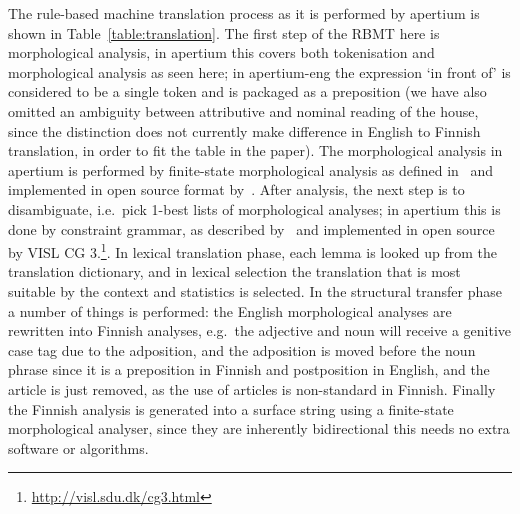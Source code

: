 \documentclass[free]{flammie}
\begin{document}
The rule-based machine translation process as it is performed by apertium is
shown in Table~\ref{table:translation}. The first step of the RBMT here is
morphological analysis, in apertium this covers both tokenisation and
morphological analysis as seen here; in apertium-eng the expression `in front
of' is considered to be a single token and is packaged as a preposition (we have
also omitted an ambiguity between attributive and nominal reading of the house,
since the distinction does not currently make difference in English to Finnish
translation, in order to fit the table in the paper). The morphological analysis
in apertium is performed by finite-state morphological analysis as defined
in~\cite{beesley2003finite} and implemented in open source format
by~\cite{linden2011hfst}.  After analysis, the next step is to disambiguate,
i.e.\ pick 1-best lists of morphological analyses; in apertium this is done by
constraint grammar, as described by~\cite{karlsson1990constraint} and
implemented in open source by VISL CG
3.\footnote{\url{http://visl.sdu.dk/cg3.html}}. In lexical translation phase,
each lemma is looked up from the translation dictionary, and in lexical
selection the translation that is most suitable by the context and statistics is
selected. In the structural transfer phase a number of things is performed: the
English morphological analyses are rewritten into Finnish analyses, e.g.\  the
adjective and noun will receive a genitive case tag due to the adposition, and
the adposition is moved before the noun phrase since it is a preposition in
Finnish and postposition in English, and the article is just removed, as the use
of articles is non-standard in Finnish.  Finally the Finnish analysis is
generated into a surface string using a finite-state morphological analyser,
since they are inherently bidirectional this needs no extra software or
algorithms.
\end{document}
